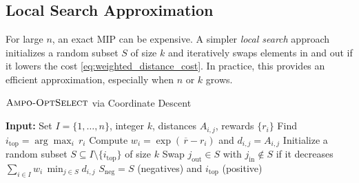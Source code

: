 \vspace{-0.1in}
\subsection{Local Search Approximation}

\vspace{-0.1in}
For large $n$, an exact MIP can be expensive. A simpler \emph{local search} approach initializes a random subset $S$ of size $k$ and iteratively swaps elements in and out if it lowers the cost \eqref{eq:weighted_distance_cost}. In practice, this provides an efficient approximation, especially when $n$ or $k$ grows.

\begin{algorithm}[t]
\caption{\textcolor{titlecolor}{$\textsc{Ampo-OptSelect}$ via Coordinate Descent}}
\label{alg:opt_select_local_search}
\begin{algorithmic}[1]
    \STATE \textcolor{inputcolor}{\textbf{Input:} Set $I = \{1,\dots,n\}$, integer $k$, distances $A_{i,j}$, rewards $\{r_i\}$}
    \STATE \textcolor{mathcolor}{Find $i_{\mathrm{top}} = \arg\max_{i}\, r_i$}
    \STATE \textcolor{mathcolor}{Compute $w_i = \exp(\,\overline{r} - r_i)$ and $d_{i,j}=A_{i,j}$}
    \STATE \textcolor{mathcolor}{Initialize a random subset $S \subseteq I\setminus\{i_{\mathrm{top}}\}$ of size $k$}
        \STATE \textcolor{mathcolor}{Swap $j_{\mathrm{out}} \in S$ with $j_{\mathrm{in}} \notin S$ if it decreases $\sum_{i \in I} w_i\,\min_{j \in S} d_{i,j}$}
    \ENDWHILE
    \RETURN \textcolor{outputcolor}{$S_{\mathrm{neg}}=S$ (negatives) and $i_{\mathrm{top}}$ (positive)}
\end{algorithmic}
\end{algorithm}


